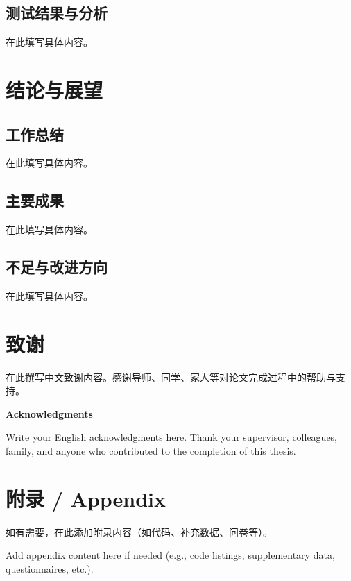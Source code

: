 \documentclass[a4paper,12pt,oneside]{ctexart}
\begin{document}
\subsection{测试结果与分析}
在此填写具体内容。


\section{结论与展望}
\subsection{工作总结}
在此填写具体内容。

\subsection{主要成果}
在此填写具体内容。

\subsection{不足与改进方向}
在此填写具体内容。






\section*{致\quad 谢}

在此撰写中文致谢内容。感谢导师、同学、家人等对论文完成过程中的帮助与支持。

\vspace{1cm}
\begin{center}
{\large \textbf{Acknowledgments}}
\end{center}
\vspace{0.3cm}

Write your English acknowledgments here. Thank your supervisor, colleagues, family, and anyone who contributed to the completion of this thesis.

\appendix
\section{附录 / Appendix}
如有需要，在此添加附录内容（如代码、补充数据、问卷等）。

Add appendix content here if needed (e.g., code listings, supplementary data, questionnaires, etc.).

\end{document}
